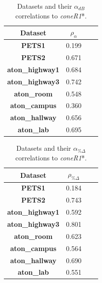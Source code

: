 \documentclass[12pt]{report}
\begin{document}
\begin{table}
\centering
\begin{tabular}{ |c|c|c|c| }
	\hline
	\textbf{Dataset} & \textbf{$\rho_{\alpha}$} \\
	\hline
	\hline
	\textbf{PETS1} & 0.199 \\
	\hline
	\textbf{PETS2} & 0.671 \\
	\hline
	\textbf{aton\_highway1} & 0.684 \\
	\hline
	\textbf{aton\_highway3} & 0.742 \\
	\hline
	\textbf{aton\_room} & 0.548 \\
	\hline
	\textbf{aton\_campus} & 0.360 \\
	\hline
	\textbf{aton\_hallway} & 0.656 \\
	\hline
	\textbf{aton\_lab} &  0.695 \\
	\hline
\end{tabular}
\caption{Datasets and their $\alpha_{dB}$ correlations to \textit{coneR1}*.}
\label{table:corr_db}
\end{table}

\begin{table}
\centering
\begin{tabular}{ |c|c|c|c| }
	\hline
	\textbf{Dataset} & \textbf{$\rho_{\%\Delta}$} \\
	\hline
	\hline
	\textbf{PETS1} & 0.184 \\
	\hline
	\textbf{PETS2} & 0.743 \\
	\hline
	\textbf{aton\_highway1} & 0.592 \\
	\hline
	\textbf{aton\_highway3} & 0.801 \\
	\hline
	\textbf{aton\_room} & 0.623 \\
	\hline
	\textbf{aton\_campus} & 0.564 \\
	\hline
	\textbf{aton\_hallway} & 0.690 \\
	\hline
	\textbf{aton\_lab} & 0.551 \\
	\hline
\end{tabular}
\caption{Datasets and their $\alpha_{\%\Delta}$ correlations to \textit{coneR1}*.}
\label{table:corr_rgb}
\end{table}
\end{document}
